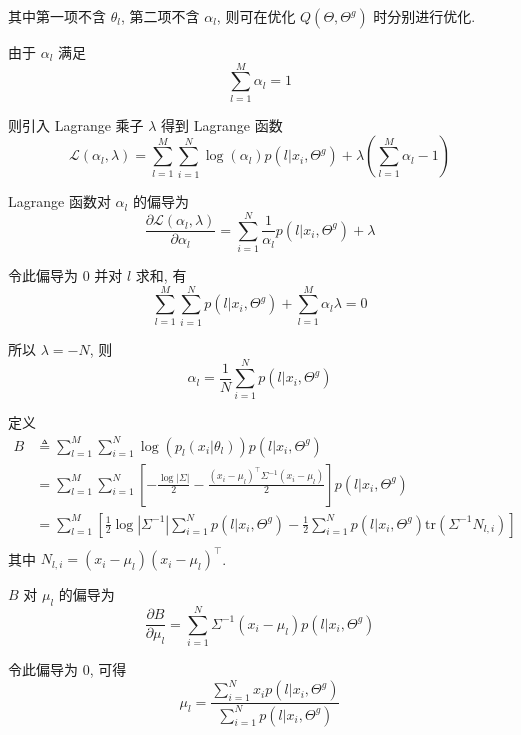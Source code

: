 \documentclass{article}
\begin{document}
其中第一项不含 $\theta_l$, 第二项不含 $\alpha_l$, 则可在优化 $Q(\Theta,\Theta^g)$ 时分别进行优化.

由于 $\alpha_l$ 满足
\begin{equation}
  \sum_{l=1}^M\alpha_l=1
\end{equation}

则引入 Lagrange 乘子 $\lambda$ 得到 Lagrange 函数
\begin{equation}
  \mathcal{L}(\alpha_l,\lambda)=\sum_{l=1}^M\sum_{i=1}^N\log(\alpha_l)p(l|x_i,\Theta^g)+\lambda\left(\sum_{l=1}^M\alpha_l-1\right)
\end{equation}

Lagrange 函数对 $\alpha_l$ 的偏导为
\begin{equation}
  \frac{\partial \mathcal{L}(\alpha_l,\lambda)}{\partial \alpha_l}
  =\sum_{i=1}^N\frac{1}{\alpha_l}p(l|x_i,\Theta^g)+\lambda
\end{equation}

令此偏导为 0 并对 $l$ 求和, 有
\begin{equation}
  \sum_{l=1}^M\sum_{i=1}^Np(l|x_i,\Theta^g)+\sum_{l=1}^M\alpha_l\lambda=0
\end{equation}

所以 $\lambda=-N$, 则
\begin{equation}
  \alpha_l=\frac{1}{N}\sum_{i=1}^Np(l|x_i,\Theta^g)
\end{equation}

定义
\begin{equation}
  \begin{aligned}
    B
    &\triangleq\sum_{l=1}^M\sum_{i=1}^N\log(p_l(x_i|\theta_l))p(l|x_i,\Theta^g)\\
    &=\sum_{l=1}^M\sum_{i=1}^N\left[-\frac{\log|\Sigma|}{2}-\frac{(x_i-\mu_l)^{\top}\Sigma^{-1}(x_i-\mu_l)}{2}\right]p(l|x_i,\Theta^g)\\
    &=\sum_{l=1}^M\left[\frac{1}{2}\log|\Sigma^{-1}|\sum_{i=1}^Np(l|x_i,\Theta^g)-\frac{1}{2}\sum_{i=1}^Np(l|x_i,\Theta^g)\mathrm{tr}\left(\Sigma^{-1}N_{l,i}\right)\right]\\
  \end{aligned}
\end{equation}
其中 $N_{l,i}=(x_i-\mu_l)(x_i-\mu_l)^{\top}$.

$B$ 对 $\mu_l$ 的偏导为
\begin{equation}
  \frac{\partial B}{\partial\mu_l}=\sum_{i=1}^N\Sigma^{-1}(x_i-\mu_l)p(l|x_i,\Theta^g)
\end{equation}

令此偏导为 0, 可得
\begin{equation}
  \mu_l=\frac{\displaystyle\sum_{i=1}^Nx_ip(l|x_i,\Theta^g)}{\displaystyle\sum_{i=1}^Np(l|x_i,\Theta^g)}
\end{equation}
\end{document}
